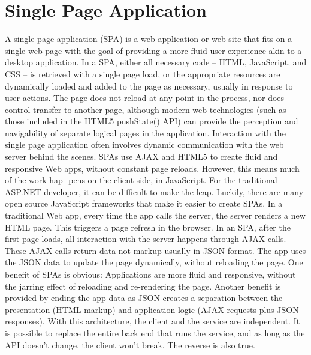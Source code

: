 \section{Single Page Application}
\label{sec:single_page_application}
A single-page application (SPA) is a web application or web site that fits on a single web page with the goal of providing a more fluid user experience akin to a desktop application. In a SPA, either all necessary code – HTML, JavaScript, and CSS – is retrieved with a single page load,\cite{arc_asp} or the appropriate resources are dynamically loaded and added to the page as necessary, usually in response to user actions. The page does not reload at any point in the process, nor does control transfer to another page, although modern web technologies (such as those included in the HTML5 pushState() API) can provide the perception and navigability of separate logical pages in the application. Interaction with the single page application often involves dynamic communication with the web server behind the scenes.
\newline
SPAs use AJAX and HTML5 to create fluid and responsive Web apps, without constant page reloads. However, this means much of the work hap- pens on the client side, in JavaScript. For the traditional ASP.NET developer, it can be difficult to make the leap. Luckily, there are many open source JavaScript frameworks that make it easier to create SPAs.
\newline
In a traditional Web app, every time the app calls the server, the server renders a new HTML page. This triggers a page refresh in the browser.
\newline
In an SPA, after the first page loads, all interaction with the server happens through AJAX calls. These AJAX calls return data-not markup usually in JSON format. The app uses the JSON data to update the page dynamically, without reloading the page.
\newline
One benefit of SPAs is obvious: Applications are more fluid and responsive, without the jarring effect of reloading and re-rendering the page. Another benefit is provided by ending the app data as JSON creates a separation between the presentation (HTML markup) and application logic (AJAX requests plus JSON responses). With this architecture, the client and the service are independent. It is possible to replace the entire back end that runs the service, and as long as the API doesn’t change, the client won’t break. The reverse is also true.